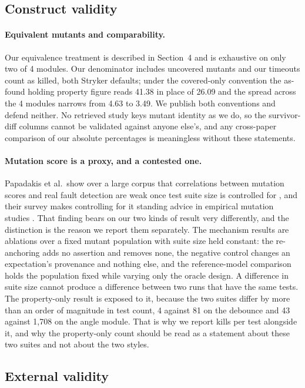\documentclass[12pt]{article}
\begin{document}
\subsection{Construct validity}

\paragraph{Equivalent mutants and comparability.} Our equivalence treatment is
described in Section~4 and is exhaustive on only two of 4 modules. Our
denominator includes uncovered mutants and our timeouts count as killed, both
Stryker defaults; under the covered-only convention \cite{schuler2011} the as-found holding property figure reads 41.38 in place of 26.09 and the spread
across the 4 modules narrows from 4.63 to 3.49. We publish both conventions and defend neither. No retrieved study keys mutant identity as we do, so the
survivor-diff columns cannot be validated against anyone else's, and any
cross-paper comparison of our absolute percentages is meaningless without these
statements.

\paragraph{Mutation score is a proxy, and a contested one.} Papadakis et al.\ show over a large corpus that correlations between mutation scores and
real fault detection are weak once test suite size is controlled for
\cite{papadakis2018}, and their survey makes controlling for it standing advice
in empirical mutation studies \cite{papadakis2019}. That finding bears on our two kinds of result very
differently, and the distinction is the reason we report them separately. The
mechanism results are ablations over a fixed mutant population with suite size
held constant: the re-anchoring adds no assertion and removes none, the negative
control changes an expectation's provenance and nothing else, and the
reference-model comparison holds the population fixed while varying only the
oracle design. A difference in suite size cannot produce a difference between two runs that have
the same tests. The property-only result is exposed to it, because
the two suites differ by more than an order of magnitude in test count, 4 against
81 on the debounce and 43 against 1{,}708 on the angle module. That is why we
report kills per test alongside it, and why the property-only count should be read as a statement about these two suites and not about the two styles.

\subsection{External validity}
\end{document}
